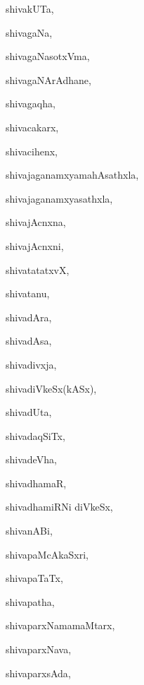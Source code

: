 \begin{multicols}{3}
{\noindent
{shivakUTa}, \pageref{shivakUTa}

\noindent
{shivagaNa}, \pageref{shivagaNa}

\noindent
{shivagaNasotxVma}, \pageref{shivagaNasotxVma}

\noindent
{shivagaNArAdhane}, \pageref{shivagaNArAdhane}

\noindent
{shivagaqha}, \pageref{shivagaqha}

\noindent
{shivacakarx}, \pageref{shivacakarx}

\noindent
{shivacihenx}, \pageref{shivacihenx}

\noindent
{shivajaganamxyamahAsathxla}, \pageref{shivajaganamxyamahAsathxla}

\noindent
{shivajaganamxyasathxla}, \pageref{shivajaganamxyasathxla}

\noindent
{shivajAcnxna}, \pageref{shivajAcnxna}

\noindent
{shivajAcnxni}, \pageref{shivajAcnxni}

\noindent
{shivatatatxvX}, \pageref{shivatatatxvX}

\noindent
{shivatanu}, \pageref{shivatanu}

\noindent
{shivadAra}, \pageref{shivadAra}

\noindent
{shivadAsa}, \pageref{shivadAsa}

\noindent
{shivadivxja}, \pageref{shivadivxja}

\noindent
{shivadiVkeSx(kASx)}, \pageref{shivadiVkeSxkASx}

\noindent
{shivadUta}, \pageref{shivadUta}

\noindent
{shivadaqSiTx}, \pageref{shivadaqSiTx}

\noindent
{shivadeVha}, \pageref{shivadeVha}

\noindent
{shivadhamaR}, \pageref{shivadhamaR}

\noindent
{shivadhamiRNi diVkeSx}, \pageref{shivadhamiRNidiVkeSx}

\noindent
{shivanABi}, \pageref{shivanABi}

\noindent
{shivapaMcAkaSxri}, \pageref{shivapaMcAkaSxri}

\noindent
{shivapaTaTx}, \pageref{shivapaTaTx}

\noindent
{shivapatha}, \pageref{shivapatha}

\noindent
{shivaparxNamamaMtarx}, \pageref{shivaparxNamamaMtarx}

\noindent
{shivaparxNava}, \pageref{shivaparxNava}

\noindent
{shivaparxsAda}, \pageref{shivaparxsAda}

}
\end{multicols}
